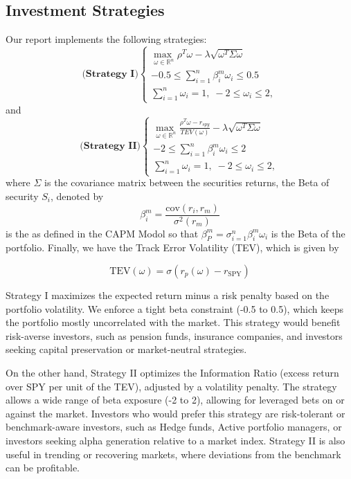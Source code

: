 \documentclass[12pt]{article}
\begin{document}
\subsection{Investment Strategies}
Our report implements the following strategies:
\[
\textbf{(Strategy I)}
\begin{cases}
	\underset{\omega\in\mathbb{R}^n}{\max\;}\rho^T \omega-\lambda\sqrt{\omega^T \Sigma\omega}\\
	-0.5\leq\sum_{i=1}^{n}\beta_i^m\omega_i\leq 0.5\\
	\sum_{i=1}^{n}\omega_i=1,\; -2\leq\omega_i\leq 2,
\end{cases}
\]
and
\[
\textbf{(Strategy II)}
\begin{cases}
	\underset{\omega\in\mathbb{R}^n}{\max\;}\frac{\rho^T \omega - r_{spy}}{TEV(\omega)} -\lambda\sqrt{\omega^T \Sigma\omega}\\
	-2\leq\sum_{i=1}^{n}\beta_i^m\omega_i\leq 2\\
	\sum_{i=1}^{n}\omega_i=1,\; -2\leq\omega_i\leq 2,
\end{cases}
\]
where $\Sigma$ is the covariance matrix between the securities returns, the Beta of security $S_i$, denoted by
\[
\beta_i^m=\frac{\text{cov}(r_i,r_m)}{\sigma^2(r_m)}
\]
is the  as defined in the CAPM Modol so that $\beta_P^m=\sigma_{i=1}^{n}\beta_i^m\omega_i$ is the Beta of the portfolio. Finally, we have the Track Error Volatility (TEV), which is given by 

\[
\text{TEV}(\omega)=\sigma(r_p(\omega)-r_{\text{SPY}})
\]

Strategy I maximizes the expected return minus a risk penalty based on the portfolio volatility. We enforce a tight beta constraint (-0.5 to 0.5), which keeps the portfolio mostly uncorrelated with the market. This strategy would benefit risk-averse investors, such as pension funds, insurance companies, and investors seeking capital preservation or market-neutral strategies. 

On the other hand, Strategy II optimizes the Information Ratio (excess return over SPY per unit of the TEV), adjusted by a volatility penalty. The strategy allows a wide range of beta exposure (-2 to 2), allowing for leveraged bets on or against the market. Investors who would prefer this strategy are risk-tolerant or benchmark-aware investors, such as Hedge funds, Active portfolio managers, or investors seeking alpha generation relative to a market index. Strategy II is also useful in trending or recovering markets, where deviations from the benchmark can be profitable.
\end{document}
